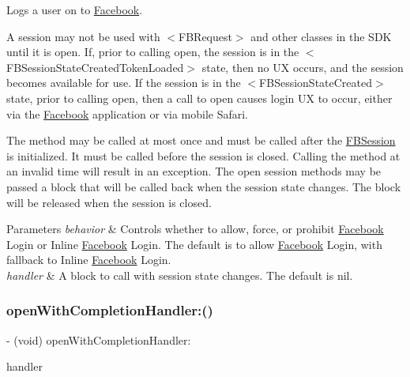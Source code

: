 Logs a user on to \hyperlink{interfaceFacebook}{Facebook}.

A session may not be used with $<$\+F\+B\+Request$>$ and other classes in the S\+DK until it is open. If, prior to calling open, the session is in the $<$\+F\+B\+Session\+State\+Created\+Token\+Loaded$>$ state, then no UX occurs, and the session becomes available for use. If the session is in the $<$\+F\+B\+Session\+State\+Created$>$ state, prior to calling open, then a call to open causes login UX to occur, either via the \hyperlink{interfaceFacebook}{Facebook} application or via mobile Safari.

The method may be called at most once and must be called after the {\ttfamily \hyperlink{interfaceFBSession}{F\+B\+Session}} is initialized. It must be called before the session is closed. Calling the method at an invalid time will result in an exception. The open session methods may be passed a block that will be called back when the session state changes. The block will be released when the session is closed.


\begin{DoxyParams}{Parameters}
{\em behavior} & Controls whether to allow, force, or prohibit \hyperlink{interfaceFacebook}{Facebook} Login or Inline \hyperlink{interfaceFacebook}{Facebook} Login. The default is to allow \hyperlink{interfaceFacebook}{Facebook} Login, with fallback to Inline \hyperlink{interfaceFacebook}{Facebook} Login. \\
\hline
{\em handler} & A block to call with session state changes. The default is nil. \\
\hline
\end{DoxyParams}
\mbox{\label{interfaceFBSession_a874152230789c87cd181d1f976e3715f}} 
\subsubsection{\texorpdfstring{open\+With\+Completion\+Handler\+:()}{openWithCompletionHandler:()}\hspace{0.1cm}{\footnotesize\ttfamily [1/5]}}
{\footnotesize\ttfamily -\/ (void) open\+With\+Completion\+Handler\+: \begin{DoxyParamCaption}\item[{(F\+B\+Session\+State\+Handler)}]{handler }\end{DoxyParamCaption}}

